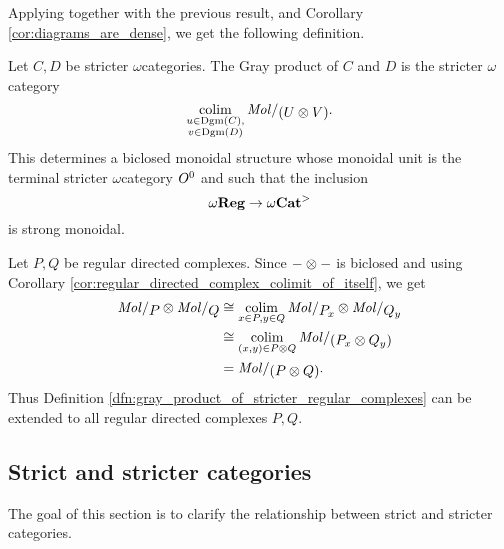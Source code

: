 Applying \cite[Th\'eor\`eme 5.3]{ara2020joint} together with the previous result, and Corollary \ref{cor:diagrams_are_dense}, we get the following definition.
\begin{dfn} 
    Let \( C, D \) be stricter \( \omega \)\nbd categories.
    The Gray product of \( C \) and \( D \) is the stricter \( \omega \)\nbd category
    \begin{equation*}
        \colim_{\substack{u \in \Dgm(C),\\ v \in \Dgm(D)}} \molecin{(U \gray V)}.
    \end{equation*}
    This determines a biclosed monoidal structure whose monoidal unit is the terminal stricter \( \omega \)\nbd category \( O^{0} \) and such that the inclusion
    \begin{equation*}
        \omega\mathbf{Reg} \to {\omega\mathbf{Cat}}^>
    \end{equation*}
    is strong monoidal.
\end{dfn}

\begin{rmk}
    Let \( P, Q \) be regular directed complexes.
    Since \( - \otimes - \) is biclosed and using Corollary \ref{cor:regular_directed_complex_colimit_of_itself}, we get
    \begin{align*}
        \molecin{P} \gray \molecin{Q} &\cong \colim_{x \in P, y \in Q} \molecin{\imel{P}{x}} \gray \molecin{\imel{Q}{y}} \\
                                      &\cong \colim_{(x, y) \in P \gray Q} \molecin{(\imel{P}{x} \gray \imel{Q}{y})} \\
                                      &= \molecin{(P \gray Q)}.
    \end{align*}
    Thus Definition \ref{dfn:gray_product_of_stricter_regular_complexes} can be extended to all regular directed complexes \( P, Q \).
\end{rmk}

\subsection{Strict and stricter categories}

The goal of this section is to clarify the relationship between strict and stricter categories.

